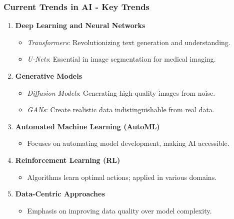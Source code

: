 \documentclass[aspectratio=169]{beamer}
\begin{document}
\begin{frame}[fragile]
    \frametitle{Current Trends in AI - Key Trends}
    \begin{enumerate}
        \item \textbf{Deep Learning and Neural Networks}
        \begin{itemize}
            \item \textit{Transformers}: Revolutionizing text generation and understanding.
            \item \textit{U-Nets}: Essential in image segmentation for medical imaging.
        \end{itemize}

        \item \textbf{Generative Models}
        \begin{itemize}
            \item \textit{Diffusion Models}: Generating high-quality images from noise.
            \item \textit{GANs}: Create realistic data indistinguishable from real data.
        \end{itemize}
        
        \item \textbf{Automated Machine Learning (AutoML)}
        \begin{itemize}
            \item Focuses on automating model development, making AI accessible.
        \end{itemize}
        
        \item \textbf{Reinforcement Learning (RL)}
        \begin{itemize}
            \item Algorithms learn optimal actions; applied in various domains.
        \end{itemize}
        
        \item \textbf{Data-Centric Approaches}
        \begin{itemize}
            \item Emphasis on improving data quality over model complexity.
        \end{itemize}
    \end{enumerate}
\end{frame}
\end{document}
